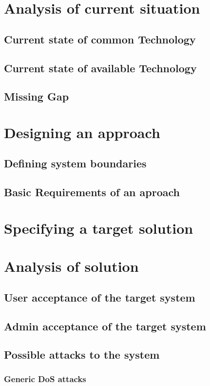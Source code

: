 \documentclass[11pt,a4paper]{book}
\begin{document}
\chapter{Analysis of current situation\label{chap:analysis}}
\section{Current state of common Technology}
\section{Current state of available Technology}
\section{Missing Gap}


\chapter{Designing an approach}
\section{Defining system boundaries}
\section{Basic Requirements of an aproach}

\chapter{Specifying a target solution}

\chapter{Analysis of solution}
\section{User acceptance of the target system}
\section{Admin acceptance of the target system}
\section{Possible attacks to the system}
\subsection{Generic DoS attacks}
\end{document}
